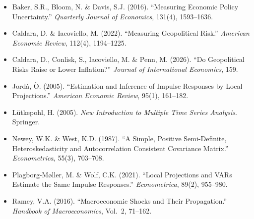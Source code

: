 \documentclass[11pt,a4paper]{article}
\begin{document}
\begin{itemize}[itemsep=4pt, leftmargin=1.5em]
    \item Baker, S.R., Bloom, N. \& Davis, S.J. (2016). ``Measuring Economic Policy Uncertainty.'' \textit{Quarterly Journal of Economics}, 131(4), 1593--1636.
    \item Caldara, D. \& Iacoviello, M. (2022). ``Measuring Geopolitical Risk.'' \textit{American Economic Review}, 112(4), 1194--1225.
    \item Caldara, D., Conlisk, S., Iacoviello, M. \& Penn, M. (2026). ``Do Geopolitical Risks Raise or Lower Inflation?'' \textit{Journal of International Economics}, 159.
    \item Jord\`a, \`O. (2005). ``Estimation and Inference of Impulse Responses by Local Projections.'' \textit{American Economic Review}, 95(1), 161--182.
    \item L\"utkepohl, H. (2005). \textit{New Introduction to Multiple Time Series Analysis}. Springer.
    \item Newey, W.K. \& West, K.D. (1987). ``A Simple, Positive Semi-Definite, Heteroskedasticity and Autocorrelation Consistent Covariance Matrix.'' \textit{Econometrica}, 55(3), 703--708.
    \item Plagborg-M\o ller, M. \& Wolf, C.K. (2021). ``Local Projections and VARs Estimate the Same Impulse Responses.'' \textit{Econometrica}, 89(2), 955--980.
    \item Ramey, V.A. (2016). ``Macroeconomic Shocks and Their Propagation.'' \textit{Handbook of Macroeconomics}, Vol.~2, 71--162.
\end{itemize}
\end{document}
